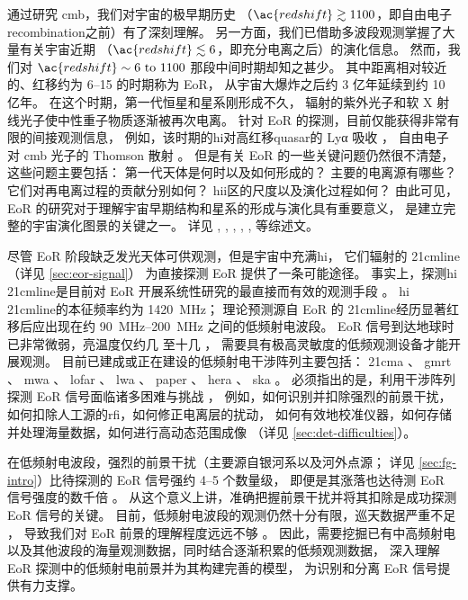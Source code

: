通过研究 \ac{cmb}，我们对宇宙的极早期历史
（$\ac{redshift} \gtrsim 1100$，即自由电子\ac{recombination}之前）有了深刻理解。
另一方面，我们已借助多波段观测掌握了大量有关宇宙近期
（$\ac{redshift} \lesssim 6$，即充分电离之后）的演化信息。
然而，我们对 $\ac{redshift} \sim \numrange{6}{1100}$ 那段中间时期却知之甚少。
其中距离相对较近的、红移约为 \numrange{6}{15} 的时期称为 EoR，
从宇宙大爆炸之后约 3 亿年延续到约 10 亿年。
在这个时期，第一代恒星和星系刚形成不久，
辐射的紫外光子和软 X 射线光子使中性重子物质逐渐被再次电离。
针对 EoR 的探测，目前仅能获得非常有限的间接观测信息，
例如，该时期的\ac{hi}对高红移\ac{quasar}的 Lyα 吸收 \cite{becker2001}，
自由电子对 \ac{cmb} 光子的 Thomson 散射 \cite{kaplinghat2003}。
但是有关 EoR 的一些关键问题仍然很不清楚，这些问题主要包括：
第一代天体是何时以及如何形成的？
主要的电离源有哪些？它们对再电离过程的贡献分别如何？
\ac{hii}区的尺度以及演化过程如何？
由此可见，EoR 的研究对于理解宇宙早期结构和星系的形成与演化具有重要意义，
是建立完整的宇宙演化图景的关键之一。
详见 , ,
, ,
,  等综述文。

尽管 EoR 阶段缺乏发光天体可供观测，但是宇宙中充满\ac{hi}，
它们辐射的 \ac{21cmline}（详见 \autoref{sec:eor-signal}）
为直接探测 EoR 提供了一条可能途径。
事实上，探测\ac{hi} \ac{21cmline}是目前对 EoR 开展系统性研究的最直接而有效的观测手段
\cite{madau1997,tozzi2000,furlanetto2006,koopmans2015,furlanetto2016}。
\ac{hi} \ac{21cmline}的本征频率约为 \SI{1420}{\MHz}；
理论预测源自 EoR 的 \ac{21cmline}经历显著红移后应出现在约
\SIrange{90}{200}{\MHz} 之间的低频射电波段。
EoR 信号到达地球时已非常微弱，亮温度仅约几 \si{\mK} 至十几 \si{\mK}，
需要具有极高灵敏度的低频观测设备才能开展观测。
目前已建成或正在建设的低频射电干涉阵列主要包括：
\ac{21cma} \cite{zheng2016}、
\ac{gmrt} \cite{paciga2011}、
\ac{mwa} \cite{bowman2013,tingay2013}、
\ac{lofar} \cite{vanHaarlem2013}、
\ac{lwa} \cite{ellingson2009}、
\ac{paper} \cite{parsons2010}、
\ac{hera} \cite{deBoer2017}、
\ac{ska} \cite{mellema2013,koopmans2015}。
必须指出的是，利用干涉阵列探测 EoR 信号面临诸多困难与挑战
\cite{morales2010,wijnholds2010}，
例如，如何识别并扣除强烈的前景干扰，如何扣除人工源的\ac{rfi}，如何修正电离层的扰动，
如何有效地校准仪器，如何存储并处理海量数据，如何进行高动态范围成像
（详见 \autoref{sec:det-difficulties}）。

在低频射电波段，强烈的前景干扰（主要源自银河系以及河外点源；
详见 \autoref{sec:fg-intro}）比待探测的 EoR 信号强约 4--5 个数量级，
即便是其涨落也达待测 EoR 信号强度的数千倍 \cite{zaroubi2013}。
从这个意义上讲，准确把握前景干扰并将其扣除是成功探测 EoR 信号的关键。
目前，低频射电波段的观测仍然十分有限，巡天数据严重不足
\cite{deOliveiraCosta2008,zheng2017gal}，
导致我们对 EoR 前景的理解程度远远不够
\cite{liu2012,harker2015,offringa2016,murray2017,procopio2017}。
因此，需要挖掘已有中高频射电以及其他波段的海量观测数据，同时结合逐渐积累的低频观测数据，
深入理解 EoR 探测中的低频射电前景并为其构建完善的模型，
为识别和分离 EoR 信号提供有力支撑。


